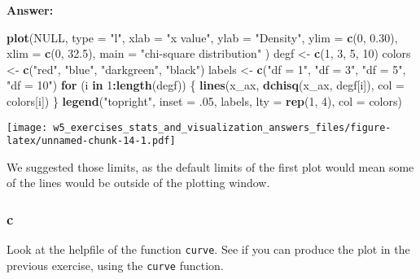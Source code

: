 \documentclass[]{article}
\newenvironment{Shaded}{\begin{snugshade}}{\end{snugshade}}
\newcommand{\ControlFlowTok}[1]{\textcolor[rgb]{0.13,0.29,0.53}{\textbf{#1}}}
\newcommand{\DataTypeTok}[1]{\textcolor[rgb]{0.13,0.29,0.53}{#1}}
\newcommand{\DecValTok}[1]{\textcolor[rgb]{0.00,0.00,0.81}{#1}}
\newcommand{\FloatTok}[1]{\textcolor[rgb]{0.00,0.00,0.81}{#1}}
\newcommand{\KeywordTok}[1]{\textcolor[rgb]{0.13,0.29,0.53}{\textbf{#1}}}
\newcommand{\NormalTok}[1]{#1}
\newcommand{\OperatorTok}[1]{\textcolor[rgb]{0.81,0.36,0.00}{\textbf{#1}}}
\newcommand{\OtherTok}[1]{\textcolor[rgb]{0.56,0.35,0.01}{#1}}
\newcommand{\StringTok}[1]{\textcolor[rgb]{0.31,0.60,0.02}{#1}}
\begin{document}
\textbf{Answer:}

\begin{Shaded}
\begin{Highlighting}[]
\KeywordTok{plot}\NormalTok{(}\OtherTok{NULL}\NormalTok{, }\DataTypeTok{type =} \StringTok{"l"}\NormalTok{, }
  \DataTypeTok{xlab =} \StringTok{"x value"}\NormalTok{, }\DataTypeTok{ylab =} \StringTok{"Density"}\NormalTok{, }
  \DataTypeTok{ylim =} \KeywordTok{c}\NormalTok{(}\DecValTok{0}\NormalTok{, }\FloatTok{0.30}\NormalTok{), }\DataTypeTok{xlim =} \KeywordTok{c}\NormalTok{(}\DecValTok{0}\NormalTok{, }\FloatTok{32.5}\NormalTok{), }
  \DataTypeTok{main =} \StringTok{"chi-square distribution"}
\NormalTok{)}
\NormalTok{degf <-}\StringTok{ }\KeywordTok{c}\NormalTok{(}\DecValTok{1}\NormalTok{, }\DecValTok{3}\NormalTok{, }\DecValTok{5}\NormalTok{, }\DecValTok{10}\NormalTok{)}
\NormalTok{colors <-}\StringTok{ }\KeywordTok{c}\NormalTok{(}\StringTok{"red"}\NormalTok{, }\StringTok{"blue"}\NormalTok{, }\StringTok{"darkgreen"}\NormalTok{, }\StringTok{"black"}\NormalTok{)}
\NormalTok{labels <-}\StringTok{ }\KeywordTok{c}\NormalTok{(}\StringTok{"df = 1"}\NormalTok{, }\StringTok{"df = 3"}\NormalTok{, }\StringTok{"df = 5"}\NormalTok{, }\StringTok{"df = 10"}\NormalTok{)}
\ControlFlowTok{for}\NormalTok{ (i }\ControlFlowTok{in} \DecValTok{1}\OperatorTok{:}\KeywordTok{length}\NormalTok{(degf)) \{}
  \KeywordTok{lines}\NormalTok{(x_ax, }\KeywordTok{dchisq}\NormalTok{(x_ax, degf[i]), }\DataTypeTok{col =}\NormalTok{ colors[i])}
\NormalTok{\}}
\KeywordTok{legend}\NormalTok{(}\StringTok{"topright"}\NormalTok{, }\DataTypeTok{inset =} \FloatTok{.05}\NormalTok{, labels, }\DataTypeTok{lty =} \KeywordTok{rep}\NormalTok{(}\DecValTok{1}\NormalTok{, }\DecValTok{4}\NormalTok{), }\DataTypeTok{col =}\NormalTok{ colors)}
\end{Highlighting}
\end{Shaded}

\texttt{[image: w5\_exercises\_stats\_and\_visualization\_answers\_files/figure-latex/unnamed-chunk-14-1.pdf]}

We suggested those limits, as the default limits of the first plot would
mean some of the lines would be outside of the plotting window.

\hypertarget{c-3}{%
\subsubsection{c}\label{c-3}}

Look at the helpfile of the function \texttt{curve}. See if you can
produce the plot in the previous exercise, using the \texttt{curve}
function.
\end{document}
